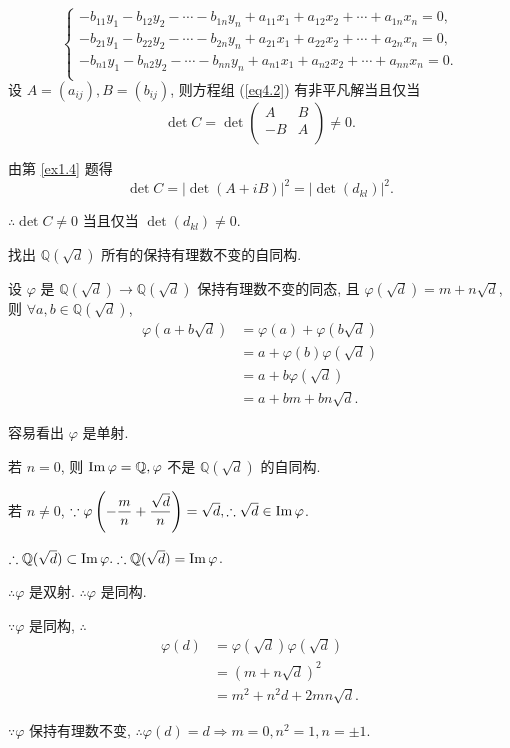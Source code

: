 \documentclass[color=black,device=normal,lang=cn,mode=geye]{elegantnote}
\begin{document}
\begin{solution}
\begin{equation}
\begin{cases}
            -b_{11}y_1-b_{12}y_2-\cdots-b_{1n}y_n+a_{11}x_1+a_{12}x_2+\cdots+a_{1n}x_n=0, \\
            -b_{21}y_1-b_{22}y_2-\cdots-b_{2n}y_n+a_{21}x_1+a_{22}x_2+\cdots+a_{2n}x_n=0, \\
            -b_{n1}y_1-b_{n2}y_2-\cdots-b_{nn}y_n+a_{n1}x_1+a_{n2}x_2+\cdots+a_{nn}x_n=0. \\
        \end{cases}
    \end{equation}
    设 $A=(a_{ij}),B=(b_{ij})$, 则方程组 (\ref{eq4.2}) 有非平凡解当且仅当
    \[\det C=\det\begin{pmatrix}
        A & B \\
        -B & A \\
    \end{pmatrix}\neq0.\]

    由第 \ref{ex1.4} 题得
    \[\det C=|\det(A+iB)|^2=|\det(d_{kl})|^2.\]

    $\therefore\det C\neq0$ 当且仅当 $\det(d_{kl})\neq0$.
\end{solution}
\begin{exercise}%
    找出 $\mathbb{Q}(\sqrt{d})$ 所有的保持有理数不变的自同构.
\end{exercise}
\begin{solution}
    设 $\varphi$ 是 $\mathbb{Q}(\sqrt{d})\to\mathbb{Q}(\sqrt{d})$ 保持有理数不变的同态, 且 $\varphi(\sqrt{d})=m+n\sqrt{d}$, 则 $\forall a,b\in\mathbb{Q}(\sqrt{d})$,
    \begin{align*}
        \varphi(a+b\sqrt{d}) & =\varphi(a)+\varphi(b\sqrt{d}) \\
        & =a+\varphi(b)\varphi(\sqrt{d}) \\
        & =a+b\varphi(\sqrt{d}) \\
        & =a+bm+bn\sqrt{d}.
    \end{align*}

    容易看出 $\varphi$ 是单射.

    若 $n=0$, 则 $\operatorname{Im} \varphi=\mathbb{Q},\varphi$ 不是 $\mathbb{Q}(\sqrt{d})$ 的自同构.

    若 $n\neq0$, $\because\varphi\left(-\dfrac{m}{n}+\dfrac{\sqrt{d}}{n}\right)=\sqrt{d},\therefore\sqrt{d}\in\operatorname{Im} \varphi$.

    $\therefore\mathbb{Q}(\sqrt{d})\subset\operatorname{Im} \varphi.\therefore\mathbb{Q}(\sqrt{d})=\operatorname{Im} \varphi$.

    $\therefore\varphi$ 是双射. $\therefore\varphi$ 是同构.

    $\because\varphi$ 是同构, $\therefore$
    \begin{align*}
        \varphi(d) & =\varphi(\sqrt{d})\varphi(\sqrt{d}) \\
        & =(m+n\sqrt{d})^2 \\
        & =m^2+n^2d+2mn\sqrt{d}.
    \end{align*}

    $\because\varphi$ 保持有理数不变, $\therefore\varphi(d)=d\Rightarrow m=0,n^2=1,n=\pm1$.
\end{solution}
\end{document}
